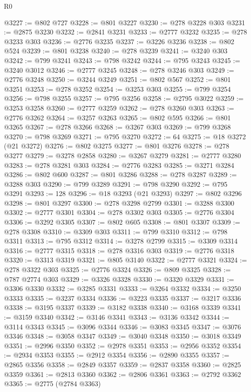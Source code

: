\begin{lexlean}{R0}
\begin{coremodule}
@3227 := @802 @727
@3228 := @801 @3227
@3230 := @278 @3228 @303
@3231 := @2875 @3230
@3232 := @2841 @3231
@3233 := @2777 @3232
@3235 := @278 @3233 @303
@3236 := @2776 @3235
@3237 := @3226 @3236
@3238 := @802 @524
@3239 := @801 @3238
@3240 := @278 @3239
@3241 := @3240 @303
@3242 := @799 @3241
@3243 := @798 @3242
@3244 := @795 @3243
@3245 := @3240 @3012
@3246 := @2777 @3245
@3248 := @278 @3246 @303
@3249 := @2776 @3248
@3250 := @3244 @3249
@3251 := @802 @567
@3252 := @801 @3251
@3253 := @278 @3252
@3254 := @3253 @303
@3255 := @799 @3254
@3256 := @798 @3255
@3257 := @795 @3256
@3258 := @2795 @3022
@3259 := @3253 @3258
@3260 := @2777 @3259
@3262 := @278 @3260 @303
@3263 := @2776 @3262
@3264 := @3257 @3263
@3265 := @802 @595
@3266 := @801 @3265
@3267 := @278 @3266
@3268 := @3267 @303
@3269 := @799 @3268
@3270 := @798 @3269
@3271 := @795 @3270
@3272 := 64
@3275 := @18 @3272 (@21 @3272)
@3276 := @802 @3275
@3277 := @801 @3276
@3278 := @278 @3277
@3279 := @3278 @2858
@3280 := @3267 @3279
@3281 := @2777 @3280
@3283 := @278 @3281 @303
@3284 := @2776 @3283
@3285 := @3271 @3284
@3286 := @802 @600
@3287 := @801 @3286
@3288 := @278 @3287
@3289 := @3288 @303
@3290 := @799 @3289
@3291 := @798 @3290
@3292 := @795 @3291
@3293 := 128
@3296 := @18 @3293 (@21 @3293)
@3297 := @802 @3296
@3298 := @801 @3297
@3300 := @278 @3298 @2799
@3301 := @3288 @3300
@3302 := @2777 @3301
@3304 := @278 @3302 @303
@3305 := @2776 @3304
@3306 := @3292 @3305
@3307 := @802 @605
@3308 := @801 @3307
@3309 := @278 @3308
@3310 := @3309 @303
@3311 := @799 @3310
@3312 := @798 @3311
@3313 := @795 @3312
@3314 := @3278 @2799
@3315 := @3309 @3314
@3316 := @2777 @3315
@3318 := @278 @3316 @303
@3319 := @2776 @3318
@3320 := @3313 @3319
@3321 := @805 @3140
@3322 := @2777 @3321
@3324 := @278 @3322 @303
@3325 := @2776 @3324
@3326 := @809 @3325
@3328 := @787 @2774 @303
@3329 := @3326 @3328
@3330 := @3320 @3329
@3331 := @3306 @3330
@3332 := @3285 @3331
@3333 := @3264 @3332
@3334 := @3250 @3333
@3335 := @3237 @3334
@3336 := @3223 @3335
@3337 := @3217 @3336
@3338 := @3195 @3337
@3339 := @3182 @3338
@3340 := @3168 @3339
@3341 := @3159 @3340
@3342 := @3146 @3341
@3343 := @3136 @3342
@3344 := @3114 @3343
@3345 := @3096 @3344
@3346 := @3083 @3345
@3347 := @3076 @3346
@3348 := @3058 @3347
@3349 := @3040 @3348
@3350 := @3018 @3349
@3351 := @2996 @3350
@3352 := @2978 @3351
@3353 := @2956 @3352
@3354 := @2934 @3353
@3355 := @2912 @3354
@3356 := @2890 @3355
@3357 := @2865 @3356
@3358 := @2849 @3357
@3359 := @2837 @3358
@3360 := @2825 @3359
@3361 := @2813 @3360
@3362 := @2806 @3361
@3363 := @2792 @3362
@3365 := @2775 (@2784 @3363)

\end{coremodule}
\end{lexlean}
